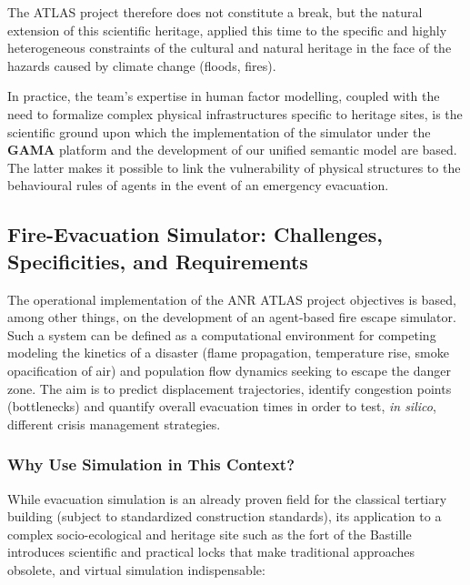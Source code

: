 \documentclass{article}
\begin{document}
The ATLAS project therefore does not constitute a break, but the natural extension of this scientific heritage, applied this time to the specific and highly heterogeneous constraints of the cultural and natural heritage in the face of the hazards caused by climate change (floods, fires).

In practice, the team's expertise in human factor modelling, coupled with the need to formalize complex physical infrastructures specific to heritage sites, is the scientific ground upon which the implementation of the simulator under the \textbf{GAMA} platform and the development of our unified semantic model are based. The latter makes it possible to link the vulnerability of physical structures to the behavioural rules of agents in the event of an emergency evacuation.

\subsection{Fire-Evacuation Simulator: Challenges, Specificities, and Requirements}
\label{subsec:simulateur_evacuation_incendie}

The operational implementation of the ANR ATLAS project objectives is based, among other things, on the development of an agent-based fire escape simulator. Such a system can be defined as a computational environment for competing modeling the kinetics of a disaster (flame propagation, temperature rise, smoke opacification of air) and population flow dynamics seeking to escape the danger zone. The aim is to predict displacement trajectories, identify congestion points (bottlenecks) and quantify overall evacuation times in order to test, \textit{in silico}, different crisis management strategies.

\subsubsection{Why Use Simulation in This Context?}

While evacuation simulation is an already proven field for the classical tertiary building (subject to standardized construction standards), its application to a complex socio-ecological and heritage site such as the fort of the Bastille introduces scientific and practical locks that make traditional approaches obsolete, and virtual simulation indispensable:
\end{document}
